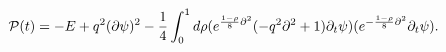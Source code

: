\begin{equation}
\label{p1} {\cal P}(t)=-E +q^2 (\partial  {\cal \psi})^2-\frac14
\int_0^1 d\rho( e^{\frac{1-\rho}{8}{\partial}^2}(
-q^2{\partial}^2+1)\partial_{t}\psi)
  ( e^{-\frac{1-\rho}{8}{\partial}^2}\partial_{t}  \psi ).
\end{equation}


